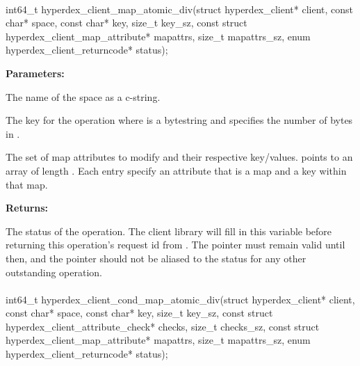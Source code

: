 \paragraph{}
\begin{ccode}
int64_t hyperdex_client_map_atomic_div(struct hyperdex_client* client,
                const char* space,
                const char* key, size_t key_sz,
                const struct hyperdex_client_map_attribute* mapattrs, size_t mapattrs_sz,
                enum hyperdex_client_returncode* status);
\end{ccode}
\funcdesc 

\noindent\textbf{Parameters:}
\begin{description}[labelindent=\widthof{{\code{mapattrs}, \code{mapattrs\_sz}}},leftmargin=*,noitemsep,nolistsep,align=right]
\item[\code{space}] The name of the space as a c-string.
\item[\code{key}, \code{key\_sz}] The key for the operation where  is a bytestring and  specifies the number of bytes in .
\item[\code{mapattrs}, \code{mapattrs\_sz}] The set of map attributes to modify and their respective key/values.   points to an array of length .  Each entry specify an attribute that is a map and a key within that map.
\end{description}

\noindent\textbf{Returns:}
\begin{description}[labelindent=\widthof{{\code{status}}},leftmargin=*,noitemsep,nolistsep,align=right]
\item[\code{status}] The status of the operation.  The client library will fill in this variable before returning this operation's request id from .  The pointer must remain valid until then, and the pointer should not be aliased to the status for any other outstanding operation.
\end{description}

\paragraph{}
\begin{ccode}
int64_t hyperdex_client_cond_map_atomic_div(struct hyperdex_client* client,
                const char* space,
                const char* key, size_t key_sz,
                const struct hyperdex_client_attribute_check* checks, size_t checks_sz,
                const struct hyperdex_client_map_attribute* mapattrs, size_t mapattrs_sz,
                enum hyperdex_client_returncode* status);
\end{ccode}
\funcdesc 

